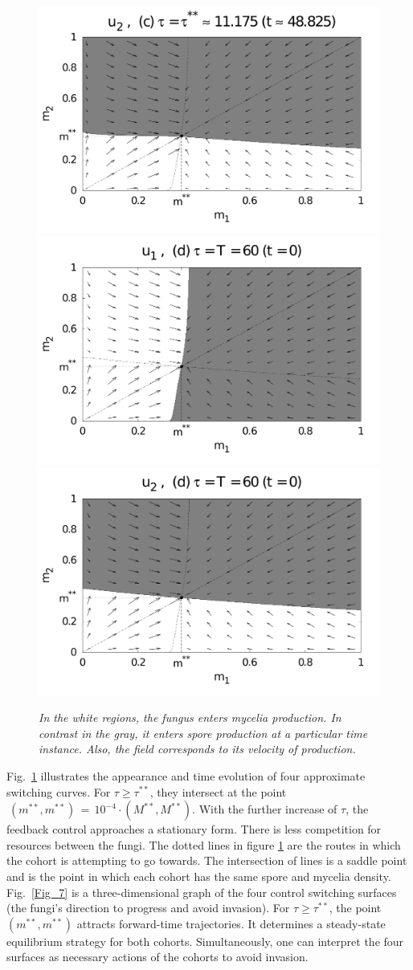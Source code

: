 \documentclass[11pt]{amsart}
\begin{document}
\begin{figure}
{\includegraphics[width = 0.48 \textwidth]{figures/Figure_5c_2.pdf} \\
\includegraphics[width = 0.48 \textwidth]{figures/Figure_5d_1.pdf}
\includegraphics[width = 0.48 \textwidth]{figures/Figure_5d_2.pdf}
}
\bf \caption{\it In the white regions, the fungus enters mycelia production. In contrast in the gray, it enters spore production at a particular time instance. Also, the field corresponds to its velocity of production. 
}
\label{Fig_5}
\end{figure}

Fig.~\ref{Fig_5} illustrates the appearance and time evolution of four
approximate switching curves. For $ \tau \geqslant \tau^{**} $, they intersect
at the point~$ \: \left( m^{**}, m^{**} \right) \, = \, 10^{-4}
\cdot \left( M^{**}, M^{**} \right) $. With the further increase of $ \tau $, the 
feedback control approaches a stationary form. There is less competition for resources between the fungi. The dotted lines in figure \ref{Fig_5} are the routes in which the cohort is attempting to go towards. The intersection of lines is a saddle point and is the point in which each cohort has the same spore and mycelia density. Fig.~\ref{Fig_7}
is a three-dimensional graph of the 
four control switching surfaces (the fungi's direction to progress and avoid invasion). 
For $ \tau \geqslant \tau^{**} $, the point~$ \left( m^{**}, m^{**} \right) $
attracts forward-time trajectories. It determines a steady-state equilibrium
strategy for both cohorts. Simultaneously, one can interpret the four surfaces as necessary actions of the cohorts to avoid invasion.
\end{document}
